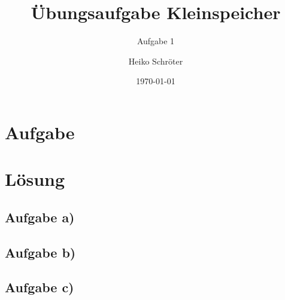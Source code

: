 \documentclass{beamer}
\title{Übungsaufgabe Kleinspeicher}
\subtitle{Aufgabe 1}
\author{Heiko Schröter}
\date{\today}
\begin{document}
\frame{\titlepage}

\frame{\tableofcontents}
\section{Aufgabe}
\section{Lösung}
\subsection{Aufgabe a)}
\subsection{Aufgabe b)}
\subsection{Aufgabe c)}
\end{document}
